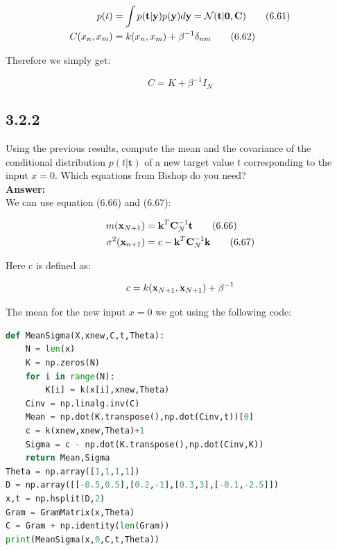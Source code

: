 \documentclass[a4paper]{article}
\begin{document}
\begin{align}
p(t) &= \int p(\textbf t | \textbf y)p(\textbf y) d \textbf y = \mathcal N (\textbf t| \textbf 0 , \textbf C) \tag{6.61}\\
C(x_n,x_m) &= k(x_n,x_m) + \beta^{-1}\delta_{nm} \tag{6.62}
\end{align}

Therefore we simply get:

\begin{equation}
C = K + \beta^{-1}I_N\label{C}
\end{equation}





\subsection*{3.2.2}

Using the previous results, compute the mean and the covariance of the conditional distribution $p(t | \textbf{t})$ of a new target value $t$ corresponding to the input $x = 0$. Which equations from Bishop do you need?\\
\textbf{Answer:}\\


We can use equation (6.66) and (6.67):

\begin{align}
m(\textbf x_{N+1}) &=\textbf k^T \textbf C_N^{-1} \textbf t \tag{6.66}\label{666}\\
\sigma^2(\textbf x_{n+1}) &= c-\textbf k^T \textbf C_N^{-1}\textbf k \tag{6.67}
\end{align}

Here c is defined as:

\begin{equation}
c = k(\textbf x_{N+1},\textbf x_{N+1})+\beta^{-1}
\end{equation}

The mean for the new input $x=0$ we got using the following code:

\begin{lstlisting}[language=Python]
def MeanSigma(X,xnew,C,t,Theta):
    N = len(x)
    K = np.zeros(N)
    for i in range(N):
        K[i] = k(x[i],xnew,Theta)
    Cinv = np.linalg.inv(C)
    Mean = np.dot(K.transpose(),np.dot(Cinv,t))[0]
    c = k(xnew,xnew,Theta)+1
    Sigma = c - np.dot(K.transpose(),np.dot(Cinv,K))
    return Mean,Sigma
Theta = np.array([1,1,1,1])
D = np.array([[-0.5,0.5],[0.2,-1],[0.3,3],[-0.1,-2.5]])
x,t = np.hsplit(D,2)
Gram = GramMatrix(x,Theta)
C = Gram + np.identity(len(Gram))
print(MeanSigma(x,0,C,t,Theta))
\end{lstlisting}
\end{document}
